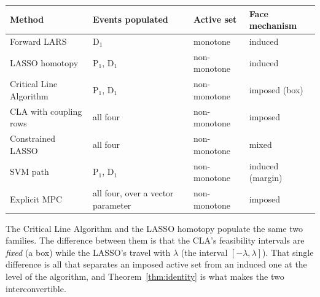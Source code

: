 \begin{center}
\footnotesize
\begin{tabular}{@{}llll@{}}
\toprule
Method & Events populated & Active set & Face mechanism \\
\midrule
Forward LARS               & $\mathrm{D}_1$
                           & monotone      & induced \\
LASSO homotopy             & $\mathrm{P}_1$, $\mathrm{D}_1$
                           & non-monotone  & induced \\
Critical Line Algorithm    & $\mathrm{P}_1$, $\mathrm{D}_1$
                           & non-monotone  & imposed (box) \\
CLA with coupling rows     & all four
                           & non-monotone  & imposed \\
Constrained LASSO          & all four
                           & non-monotone  & mixed \\
SVM path                   & $\mathrm{P}_1$, $\mathrm{D}_1$
                           & non-monotone  & induced (margin) \\
Explicit MPC               & all four, over a vector parameter
                           & non-monotone  & imposed \\
\bottomrule
\end{tabular}
\end{center}

The Critical Line Algorithm and the LASSO homotopy populate the same two families. The
difference between them is that the CLA's feasibility intervals are \emph{fixed} (a box)
while the LASSO's travel with $\lambda$ (the interval $[-\lambda,\lambda]$). That single
difference is all that separates an imposed active set from an induced one at the level
of the algorithm, and Theorem~\ref{thm:identity} is what makes the two interconvertible.
